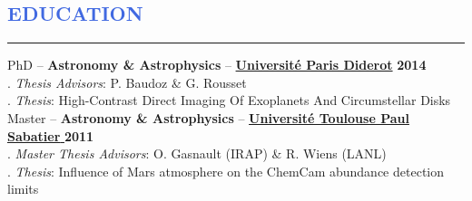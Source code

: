\documentclass[12pt]{article}
\begin{document}

%


\vspace{-0.25cm}
\textcolor{RoyalBlue}{\section{\large EDUCATION}
\vspace{-0.35cm}\hrule}
\vspace{0.4cm}

PhD -- \textbf{Astronomy \& Astrophysics} --
\href{https://www.univ-paris-diderot.fr/}{\textbf{Universit\'e Paris Diderot}}
\hfill  { \bf 2014}\\
{\small
\textcolor{blanc}{.}\hspace{0.8cm}
{\it Thesis Advisors}: P. Baudoz \& G. Rousset \\
\textcolor{blanc}{.}\hspace{0.8cm}
{\it Thesis}: High-Contrast Direct Imaging Of Exoplanets And Circumstellar Disks}\\

Master --  \textbf{Astronomy \& Astrophysics}  --
\href{http://ezomp2.omp.obs-mip.fr/asep/index.php/eng}{\textbf{Université Toulouse Paul Sabatier} }
\hfill  { \bf 2011} \\
{\small
\textcolor{blanc}{.}\hspace{0.8cm}
{\it Master Thesis Advisors}: O. Gasnault (IRAP) \& R. Wiens (LANL)\\
\textcolor{blanc}{.}\hspace{0.8cm}
{\it Thesis}: Influence of Mars atmosphere on the ChemCam abundance detection limits}\\
\end{document}
